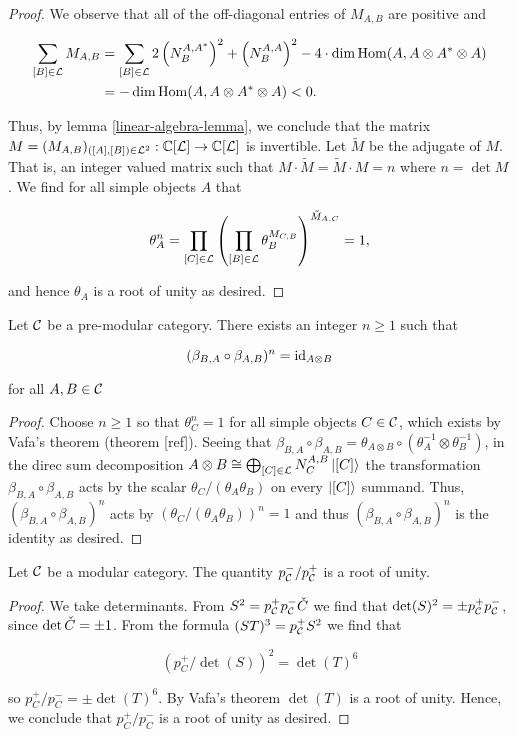 \begin{proof}
We observe that all of the off-diagonal entries of $M_{A,B}$ are positive and

\begin{align*}
\sum_{[B]\in {\mathcal L}}M_{A,B} &=\sum_{[B]\in {\mathcal L}}2\left(N^{A,A^*}_{B}\right)^2+\left(N^{A,A}_{B}\right)^2 - 4\cdot \dim \operatorname{Hom}(A,A\otimes A^*\otimes A)\\
&=  -\dim \operatorname{Hom}(A,A\otimes A^*\otimes A)<0.
\end{align*}

Thus, by lemma \ref{linear-algebra-lemma}, we conclude that the matrix $M=(M_{A,B})_{([A],[B])\in {\mathcal L}^2}: {\mathbb C}[{\mathcal L}]\to{\mathbb C}[{\mathcal L}]$ is invertible. Let $\tilde{M}$ be the adjugate of $M$. That is, an integer valued matrix such that $M\cdot \tilde{M}=\tilde{M}\cdot M = n$ where $n=\det M$. We find for all simple objects $A$ that

$$\theta_{A}^n=\prod_{[C]\in {\mathcal L}}\left(\prod_{[B]\in {\mathcal L}}\theta_{B}^{M_{C,B}}\right)^{\tilde{M}_{A,C}}=1,$$

and hence $\theta_{A}$ is a root of unity as desired.
\end{proof}

\begin{cor} Let ${\mathcal C}$ be a pre-modular category. There exists an integer $n\geq 1$ such that

$$(\beta_{B,A}\circ \beta_{A,B})^{n}=\operatorname{id}_{A\otimes B}$$

for all $A,B\in {\mathcal C}$

\end{cor}
\begin{proof} Choose $n\geq 1$ so that $\theta_{C}^n=1$ for all simple objects $C\in {\mathcal C}$, which exists by Vafa's theorem (theorem [ref]). Seeing that $\beta_{B,A}\circ \beta_{A,B}=\theta_{A\otimes B}\circ (\theta_{A}^{-1}\otimes \theta_{B}^{-1})$, in the direc sum decomposition $A\otimes B \cong \bigoplus_{[C]\in {\mathcal L}}N^{A,B}_{C}\ket{[C]}$ the transformation $\beta_{B,A}\circ \beta_{A,B}$ acts by the scalar $\theta_{C}/(\theta_{A}\theta_{B})$ on every $\ket{[C]}$ summand. Thus, $(\beta_{B,A}\circ \beta_{A,B})^n$ acts by $(\theta_{C}/(\theta_{A}\theta_{B}))^n=1$ and thus $(\beta_{B,A}\circ \beta_{A,B})^n$ is the identity as desired.
\end{proof}

\begin{cor}\label{vafa-corollary} Let ${\mathcal C}$ be a modular category. The quantity $p_{{\mathcal C}}^-/p_{{\mathcal C}}^+$ is a root of unity.
\end{cor}
\begin{proof} We take determinants. From $S^2= p^{+}_{{\mathcal C}}p^{-}_{{\mathcal C}}{\check C}$ we find that $\det(S)^2=\pm p_{{\mathcal C}}^+p_{{\mathcal C}}^-$, since $\det {\check C} = \pm 1$. From the formula $(ST)^3=p^{+}_{{\mathcal C}}S^2$ we find that

$$\left(p^{+}_C/\det(S)\right)^2=\det(T)^6$$

so $p^{+}_C/p^{-}_{C}=\pm \det(T)^6$. By Vafa's theorem $\det(T)$ is a root of unity. Hence, we conclude that $p^{+}_C/p^{-}_{C}$ is a root of unity as desired.
\end{proof}

